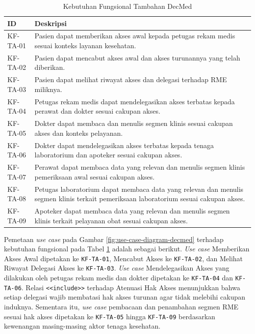 \documentclass[bahasa, 12pt, a4paper, onecolumn, oneside, final]{report}
\begin{document}
\begin{table}[!ht]
	\centering
	\caption{Kebutuhan Fungsional Tambahan DecMed}
	\label{tab:kebutuhan-fungsional-tambahan-decmed}
	\begin{tabular}{|p{2cm}|p{10.5cm}|}
		\hline
		\textbf{ID} & \textbf{Deskripsi}                                                                                                                    \\
		\hline
		KF-TA-01    & Pasien dapat memberikan akses awal kepada petugas rekam medis sesuai konteks layanan kesehatan.                                       \\ \hline
		KF-TA-02    & Pasien dapat mencabut akses awal dan akses turunannya yang telah diberikan.                                                           \\ \hline
		KF-TA-03    & Pasien dapat melihat riwayat akses dan delegasi terhadap RME miliknya.                                                                \\ \hline
		KF-TA-04    & Petugas rekam medis dapat mendelegasikan akses terbatas kepada perawat dan dokter sesuai cakupan akses.                               \\ \hline
		KF-TA-05    & Dokter dapat membaca dan menulis segmen klinis sesuai cakupan akses dan konteks pelayanan.                                            \\ \hline
		KF-TA-06    & Dokter dapat mendelegasikan akses terbatas kepada tenaga laboratorium dan apoteker sesuai cakupan akses.                              \\ \hline
		KF-TA-07    & Perawat dapat membaca data yang relevan dan menulis segmen klinis pemeriksaan awal sesuai cakupan akses.                              \\ \hline
		KF-TA-08    & Petugas laboratorium dapat membaca data yang relevan dan menulis segmen klinis terkait pemeriksaan laboratorium sesuai cakupan akses. \\ \hline
		KF-TA-09    & Apoteker dapat membaca data yang relevan dan menulis segmen klinis terkait pelayanan obat sesuai cakupan akses.                       \\ \hline
	\end{tabular}
\end{table}
\FloatBarrier

Pemetaan \textit{use case} pada Gambar \ref{fig:use-case-diagram-decmed} terhadap kebutuhan fungsional pada Tabel \ref{tab:kebutuhan-fungsional-tambahan-decmed} adalah sebagai berikut. \textit{Use case} Memberikan Akses Awal dipetakan ke \texttt{KF-TA-01}, Mencabut Akses ke \texttt{KF-TA-02}, dan Melihat Riwayat Delegasi Akses ke \texttt{KF-TA-03}. \textit{Use case} Mendelegasikan Akses yang dilakukan oleh petugas rekam medis dan dokter dipetakan ke \texttt{KF-TA-04} dan \texttt{KF-TA-06}. Relasi \texttt{<<include>>} terhadap Atenuasi Hak Akses menunjukkan bahwa setiap delegasi wajib membatasi hak akses turunan agar tidak melebihi cakupan induknya. Sementara itu, \textit{use case} pembacaan dan penambahan segmen RME sesuai hak akses dipetakan ke \texttt{KF-TA-05} hingga \texttt{KF-TA-09} berdasarkan kewenangan masing-masing aktor tenaga kesehatan.
\end{document}
